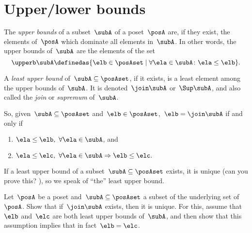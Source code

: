 \section{Upper/lower bounds}
\begin{ctdefinition}
	\label{def:least-upper-bound}
	The \emph{upper bounds} of a subset~$\subA$ of a poset~$\posA$ are, if they exist, the elements of~$\posA$ which dominate all elements in~$\subA$.
	In other words, the upper bounds of~$\subA$ are the elements of the set
	\begin{equation*}
		\upperb \subA\definedas \{ \elb \in \posAset \mid \forall \ela \in \subA  \colon \ela \leq \elb \}.
	\end{equation*}
\end{ctdefinition}

\begin{ctdefinition}
	A \emph{least upper bound} of~$\subA \subseteq \posAset$, if it exists, is a least element among the upper bounds of~$\subA$.
	It is denoted~$\join \subA$ or~$\Sup\subA$, and also called the \emph{join} or \emph{supremum} of~$\subA$.
\end{ctdefinition}

So, given~$\subA \subseteq \posAset$ and~$\elb \in \posAset$,~$\elb =  \join \subA$ if and only if
\begin{enumerate}
	\item $\ela \leq \elb, \ \forall \ela \in \subA$, and
	\item $\ela \leq \elc, \ \forall \ela \in \subA \Rightarrow \elb \leq \elc.
	      $
\end{enumerate}

If a least upper bound of a subset~$\subA \subseteq \posAset$ exists, it is unique (can you prove this?
), so we speak of ``the'' least upper bound.

\begin{exercise}
	Let~$\posA$ be a poset and~$\subA \subseteq \posAset$ a subset of the underlying set of~$\posA$.
	Show that if~$\join \subA$ exists, then it is unique.
	For this, assume that~$\elb$ and~$\elc$ are both least upper bounds of~$\subA$, and then show that this assumption implies that in fact~$\elb = \elc$.
\end{exercise}
\begin{solution}
	\missingsolution
\end{solution}

